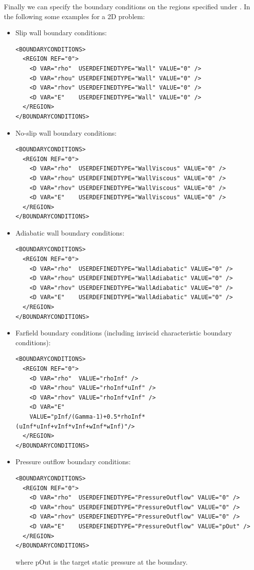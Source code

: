 Finally we can specify the boundary conditions on the regions specified under .
In the following some examples for a 2D problem:
\begin{itemize}
\item Slip wall boundary conditions:
\begin{lstlisting}[style=XmlStyle]
<BOUNDARYCONDITIONS>
  <REGION REF="0">
    <D VAR="rho"  USERDEFINEDTYPE="Wall" VALUE="0" />
    <D VAR="rhou" USERDEFINEDTYPE="Wall" VALUE="0" />
    <D VAR="rhov" USERDEFINEDTYPE="Wall" VALUE="0" />
    <D VAR="E"    USERDEFINEDTYPE="Wall" VALUE="0" />
  </REGION>
</BOUNDARYCONDITIONS>
\end{lstlisting}

\item No-slip wall boundary conditions:
\begin{lstlisting}[style=XmlStyle]
<BOUNDARYCONDITIONS>
  <REGION REF="0">
    <D VAR="rho"  USERDEFINEDTYPE="WallViscous" VALUE="0" />
    <D VAR="rhou" USERDEFINEDTYPE="WallViscous" VALUE="0" />
    <D VAR="rhov" USERDEFINEDTYPE="WallViscous" VALUE="0" />
    <D VAR="E"    USERDEFINEDTYPE="WallViscous" VALUE="0" />
  </REGION>
</BOUNDARYCONDITIONS>
\end{lstlisting}

\item Adiabatic wall boundary conditions:
\begin{lstlisting}[style=XmlStyle]
<BOUNDARYCONDITIONS>
  <REGION REF="0">
    <D VAR="rho"  USERDEFINEDTYPE="WallAdiabatic" VALUE="0" />
    <D VAR="rhou" USERDEFINEDTYPE="WallAdiabatic" VALUE="0" />
    <D VAR="rhov" USERDEFINEDTYPE="WallAdiabatic" VALUE="0" />
    <D VAR="E"    USERDEFINEDTYPE="WallAdiabatic" VALUE="0" />
  </REGION>
</BOUNDARYCONDITIONS>
\end{lstlisting}

\item Farfield boundary conditions (including inviscid characteristic boundary conditions):
\begin{lstlisting}[style=XmlStyle]
<BOUNDARYCONDITIONS>
  <REGION REF="0">
    <D VAR="rho"  VALUE="rhoInf" />
    <D VAR="rhou" VALUE="rhoInf*uInf" />
    <D VAR="rhov" VALUE="rhoInf*vInf" />
    <D VAR="E"
    VALUE="pInf/(Gamma-1)+0.5*rhoInf*(uInf*uInf+vInf*vInf+wInf*wInf)"/>
  </REGION>
</BOUNDARYCONDITIONS>
\end{lstlisting}

\item Pressure outflow boundary conditions:
\begin{lstlisting}[style=XmlStyle]
<BOUNDARYCONDITIONS>
  <REGION REF="0">
    <D VAR="rho"  USERDEFINEDTYPE="PressureOutflow" VALUE="0" />
    <D VAR="rhou" USERDEFINEDTYPE="PressureOutflow" VALUE="0" />
    <D VAR="rhov" USERDEFINEDTYPE="PressureOutflow" VALUE="0" />
    <D VAR="E"    USERDEFINEDTYPE="PressureOutflow" VALUE="pOut" />
  </REGION>
</BOUNDARYCONDITIONS>
\end{lstlisting}
where pOut is the target static pressure at the boundary.
\end{itemize}

